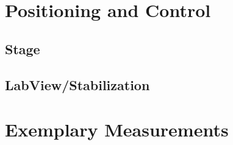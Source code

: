 \documentclass{article}
\begin{document}
\section{Positioning and Control}

\subsection{Stage}

\subsection{LabView/Stabilization}

\section{Exemplary Measurements}
\end{document}

